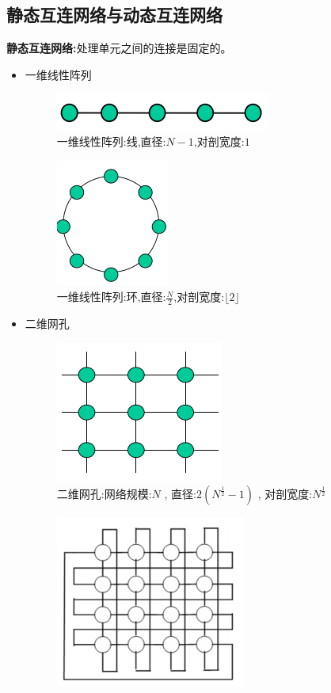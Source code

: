 \documentclass[UTF8,a4paper]{ctexart}
\begin{document}
  \subsection{静态互连网络与动态互连网络}
  \textbf{静态互连网络:}处理单元之间的连接是固定的。
  \begin{itemize}
    \item 一维线性阵列
    \begin{figure}[H]
      \centering
      \includegraphics[scale = 0.3]{assets/ParallelComputing_c8f8c.png}
      \caption{一维线性阵列:线,直径:$N-1$,对剖宽度:$1$}
    \end{figure}
    \begin{figure}[H]
      \centering
      \includegraphics[scale = 0.3]{assets/ParallelComputing_b1923.png}
      \caption{一维线性阵列:环,直径:$\frac{N}{2}$,对剖宽度:$\lfloor 2 \rfloor$}
    \end{figure}
    \item 二维网孔
    \begin{figure}[H]
      \centering
      \includegraphics[scale = 0.3]{assets/ParallelComputing_ea5ca.png}
      \caption{二维网孔:网络规模:$N$ , 直径:$2(N^{\frac{1}{2}} - 1)$ , 对剖宽度:$N^{\frac{1}{2}}$}
    \end{figure}
    \begin{figure}[H]
      \centering
      \includegraphics[scale = 0.3]{assets/ParallelComputing_5b5f4.png}

\end{figure}
\end{itemize}
\end{document}
